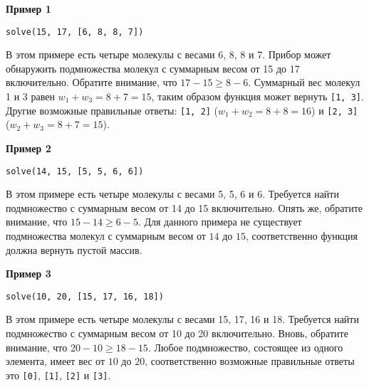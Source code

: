\textbf{Пример 1}

\texttt{solve(15, 17, [6, 8, 8, 7])}

В этом примере есть четыре молекулы с весами 6, 8, 8 и 7. Прибор может обнаружить подмножества молекул с суммарным весом от 15 до 17 включительно. Обратите внимание, что $17-15\geq 8-6$. Суммарный вес
молекул 1 и 3 равен $w_1 + w_3 = 8 + 7 = 15$, таким образом функция может вернуть \texttt{[1, 3]}. Другие возможные правильные ответы: \texttt{[1, 2]} ($w_1 + w_2 = 8 + 8 = 16$) и \texttt{[2, 3]} ($w_2 + w_3 = 8 + 7 = 15$).

\textbf{Пример 2}

\texttt{solve(14, 15, [5, 5, 6, 6])}

В этом примере есть четыре молекулы с весами 5, 5, 6 и 6. Требуется найти подмножество с суммарным весом от 14 до 15 включительно. Опять же, обратите внимание, что $15 - 14 \geq 6 - 5$. Для данного примера не существует
подмножества молекул с суммарным весом от $14$ до $15$, соответственно функция должна вернуть пустой массив.

\textbf{Пример 3}

\texttt{solve(10, 20, [15, 17, 16, 18])}

В этом примере есть четыре молекулы с весами 15, 17, 16 и 18. Требуется найти подмножество с суммарным весом от 10 до 20 включительно. Вновь, обратите внимание, что $20 - 10 \geq 18 - 15$. Любое подмножество, состоящее из одного элемента, имеет вес от $10$ до $20$, соответственно возможные правильные ответы это \texttt{[0]}, \texttt{[1]}, \texttt{[2]} и \texttt{[3]}.